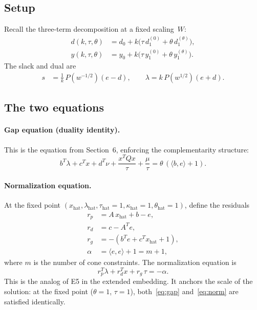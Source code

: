 \documentclass{article}
\begin{document}
\subsection{Setup}

Recall the three-term decomposition at a fixed scaling~$W$:
\begin{align}
  d(k,\tau,\theta) &= d_0 + k\bigl(\tau\,d_1^{(0)} + \theta\,d_1^{(\theta)}\bigr), \label{eq:d-decomp} \\
  y(k,\tau,\theta) &= y_0 + k\bigl(\tau\,y_1^{(0)} + \theta\,y_1^{(\theta)}\bigr). \label{eq:y-decomp}
\end{align}
The slack and dual are
\begin{align}
  s &= \tfrac{1}{k}\,P(w^{-1/2})(e - d), \qquad
  \lambda = k\,P(w^{1/2})(e + d).
\end{align}

\subsection{The two equations}

\paragraph{Gap equation (duality identity).}
This is the equation from Section~6, enforcing the complementarity structure:
\begin{equation} \label{eq:gap}
  b^T \lambda + c^T x + d^T\nu + \frac{x^T Q x}{\tau} + \frac{\mu}{\tau}
  = \theta\,(\langle b, e\rangle + 1).
\end{equation}

\paragraph{Normalization equation.}
At the fixed point $(x_{\mathrm{hat}}, \lambda_{\mathrm{hat}}, \tau_{\mathrm{hat}}=1,
\kappa_{\mathrm{hat}}=1, \theta_{\mathrm{hat}}=1)$, define the residuals
\begin{align}
  r_p &= A\,x_{\mathrm{hat}} + b - e, \\
  r_d &= c - A^T e, \\
  r_g &= -(b^T e + c^T x_{\mathrm{hat}} + 1), \\
  \alpha &= \langle e, e\rangle + 1 = m + 1,
\end{align}
where $m$ is the number of cone constraints.
The normalization equation is
\begin{equation} \label{eq:norm}
  r_p^T \lambda + r_d^T x + r_g\,\tau = -\alpha.
\end{equation}
This is the analog of E5 in the extended embedding.  It anchors the
scale of the solution: at the fixed point ($\theta=1$, $\tau=1$),
both~\eqref{eq:gap} and~\eqref{eq:norm} are satisfied identically.
\end{document}
